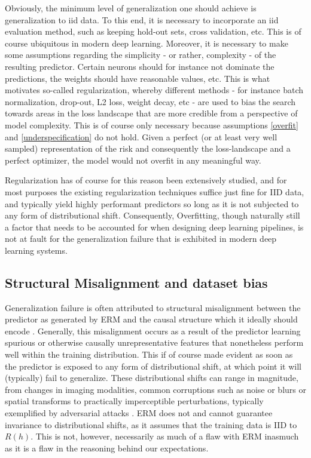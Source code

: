 		Obviously, the minimum level of generalization one should achieve is generalization to iid data. To this end, it is necessary to incorporate an iid evaluation method, such as keeping hold-out sets, cross validation, etc. This is of course ubiquitous in modern deep learning. Moreover, it is necessary to make some assumptions regarding the simplicity - or rather, complexity - of the resulting predictor. Certain neurons should for instance not dominate the predictions, the weights should have reasonable values, etc. This is what motivates so-called regularization, whereby different methods - for instance batch normalization, drop-out, L2 loss, weight decay, etc - are used to bias the search towards areas in the loss landscape that are more credible from a perspective of model complexity. This is of course only necessary because assumptions \ref{overfit} and \ref{underspecification} do not hold. Given a perfect (or at least very well sampled) representation of the risk and consequently the loss-landscape and a perfect optimizer, the model would not overfit in any meaningful way.  

		Regularization has of course for this reason been extensively studied, and for most purposes the existing regularization techniques suffice just fine for IID data, and typically yield highly performant predictors so long as it is not subjected to any form of distributional shift. Consequently, Overfitting, though naturally still a factor that needs to be accounted for when designing deep learning pipelines, is not at fault for the generalization failure that is exhibited in modern deep learning systems.


	\subsection{Structural Misalignment and dataset bias}
		Generalization failure is often attributed to structural misalignment between the predictor as generated by ERM and the causal structure which it ideally should encode \cite{adversarial_bugs_features,shortcut_learning,IRM, causality}. Generally, this misalignment occurs as a result of the predictor learning spurious or otherwise causally unrepresentative features that nonetheless perform well within the training distribution. This if of course made evident as soon as the predictor is exposed to any form of distributional shift, at which point it will (typically) fail to generalize. These distributional shifts can range in magnitude, from changes in imaging modalities, common corruptions such as noise or blurs \cite{benchmarking_robustness} or spatial transforms \cite{spatial_robustness} to practically imperceptible perturbations, typically exemplified by adversarial attacks \cite{adversarial_attacks}. ERM does not and cannot guarantee invariance to distributional shifts, as it assumes that the training data is IID to \(R(h)\). This is not, however, necessarily as much of a flaw with ERM inasmuch as it is a flaw in the reasoning behind our expectations. 
		

